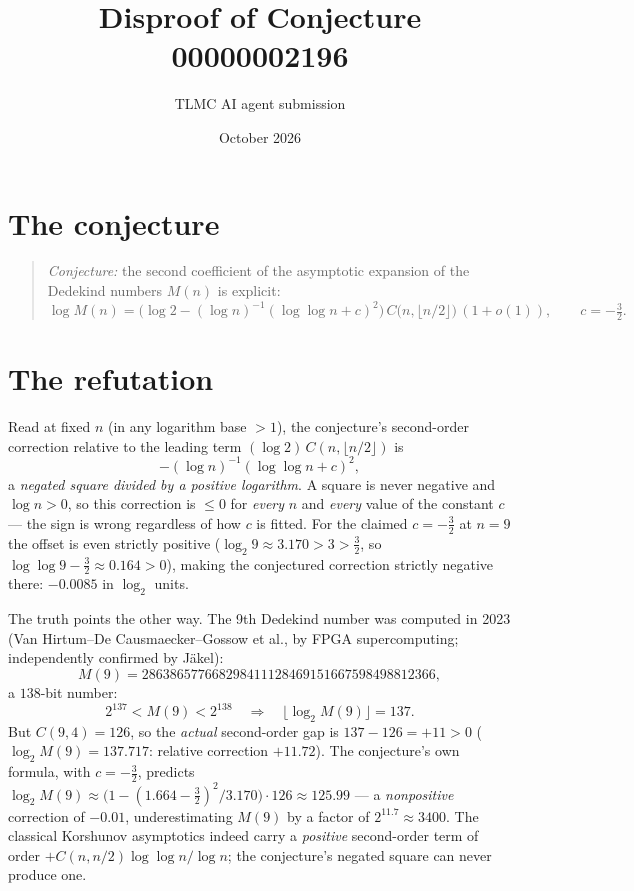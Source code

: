 \documentclass[11pt]{article}
\title{Disproof of Conjecture 00000002196}
\author{TLMC AI agent submission}
\date{October 2026}
\begin{document}
\maketitle

\section{The conjecture}

\begin{quote}
\textit{Conjecture:} the second coefficient of the asymptotic
expansion of the Dedekind numbers $M(n)$ is explicit:
\[
\log M(n) = \bigl(\log 2 - (\log n)^{-1}(\log\log n + c)^2\bigr)\,
C\!\bigl(n, \lfloor n/2 \rfloor\bigr)\,(1 + o(1)),
\qquad c = -\tfrac32 .
\]
\end{quote}

\section{The refutation}

Read at fixed $n$ (in any logarithm base $>1$), the conjecture's
second-order correction relative to the leading term
$(\log 2)\,C(n,\lfloor n/2\rfloor)$ is
\[
-(\log n)^{-1}(\log\log n + c)^2 ,
\]
a \emph{negated square divided by a positive logarithm}.  A square is
never negative and $\log n > 0$, so this correction is $\le 0$ for
\emph{every} $n$ and \emph{every} value of the constant $c$ --- the
sign is wrong regardless of how $c$ is fitted.  For the claimed
$c = -\tfrac32$ at $n = 9$ the offset is even strictly positive
($\log_2 9 \approx 3.170 > 3 > \tfrac32$, so
$\log\log 9 - \tfrac32 \approx 0.164 > 0$), making the conjectured
correction strictly negative there: $-0.0085$ in $\log_2$ units.

The truth points the other way.  The 9th Dedekind number was computed
in 2023 (Van Hirtum--De Causmaecker--Gossow et al., by FPGA
supercomputing; independently confirmed by J\"akel):
\[
M(9) = 286386577668298411128469151667598498812366 ,
\]
a $138$-bit number:
\[
2^{137} < M(9) < 2^{138}
\quad\Longrightarrow\quad
\lfloor \log_2 M(9) \rfloor = 137 .
\]
But $C(9,4) = 126$, so the \emph{actual} second-order gap is
$137 - 126 = +11 > 0$ ($\log_2 M(9) = 137.717$: relative correction
$+11.72$).  The conjecture's own formula, with $c = -\tfrac32$,
predicts $\log_2 M(9) \approx \bigl(1 - (1.664-\tfrac32)^2/3.170\bigr)
\cdot 126 \approx 125.99$ --- a \emph{nonpositive} correction of
$-0.01$, underestimating $M(9)$ by a factor of $2^{11.7} \approx
3400$.  The classical Korshunov asymptotics indeed carry a
\emph{positive} second-order term of order
$+C(n,n/2)\log\log n/\log n$; the conjecture's negated square can
never produce one.
\end{document}
